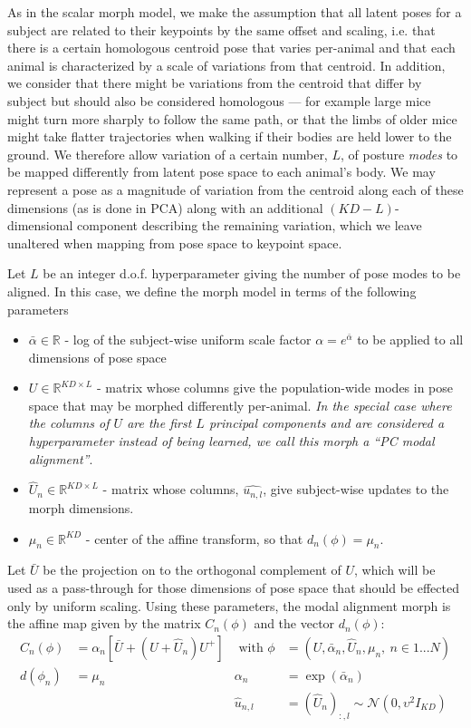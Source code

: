\documentclass{article}         %
\newcommand{\RR}{\mathbb{R}}
\newcommand{\NN}{\mathcal{N}}
\newcommand{\pn}[1]{\left( #1 \right)}
\newcommand{\bc}[1]{\left[ #1 \right]}
\begin{document}
As in the scalar morph model, we make the assumption that all latent poses for a subject are related to their keypoints by the same offset and scaling, i.e. that there is a certain homologous centroid pose that varies per-animal and that each animal is characterized by a scale of variations from that centroid. In addition, we consider that there might be variations from the centroid that differ by subject but should also be considered homologous --- for example large mice might turn more sharply to follow the same path, or that the limbs of older mice might take flatter trajectories when walking if their bodies are held lower to the ground. We therefore allow variation of a certain number, $L$, of posture \textit{modes} to be mapped differently from latent pose space to each animal's body. We may represent a pose as a magnitude of variation from the centroid along each of these dimensions (as is done in PCA) along with an additional $(KD-L)$-dimensional component describing the remaining variation, which we leave unaltered when mapping from pose space to keypoint space.

Let $L$ be an integer d.o.f. hyperparameter giving the number of pose modes to be aligned. In this case, we define the morph model in terms of the following parameters
\begin{itemize}
    \item $\bar\alpha\in\RR$ - log of the subject-wise uniform scale factor $\alpha = e^{\bar{\alpha}}$ to be applied to all dimensions of pose space
    \item $U\in \RR^{KD\times L}$ - matrix whose columns give the population-wide modes in pose space that may be morphed differently per-animal. \textit{In the special case where the columns of $U$ are the first $L$ principal components and are considered a hyperparameter instead of being learned, we call this morph a ``PC modal alignment''}.
    \item $\hat{U}_n\in\RR^{KD \times L}$ - matrix whose columns, $\hat{u_{n, l}}$, give subject-wise updates to the morph dimensions.
    \item $\mu_n\in \RR^{KD}$ - center of the affine transform, so that $d_n(\phi) = \mu_n$. 
\end{itemize}

Let $\bar{U}$ be the projection on to the orthogonal complement of $U$, which will be used as a pass-through for those dimensions of pose space that should be effected only by uniform scaling. Using these parameters, the modal alignment morph is the affine map given by the matrix $C_n(\phi)$ and the vector $d_n(\phi)$:
\begin{align}
    C_n(\phi) &= \alpha_n \bc{ \bar{U} + \pn{U + \hat{U}_n}U^+ } &\text{\ with\ } \phi &= (U, \bar\alpha_n, \hat{U}_n, \mu_n,\ n\in1...N)
    \\
    d(\phi_n) &= \mu_n & \alpha_n &= \exp\pn{\bar\alpha_n}
    \\
    && \hat{u}_{n, l} &= (\hat{U}_{n})_{:,l} \sim \NN(0, \upsilon^2 I_{KD}) 
\end{align}
\end{document}
